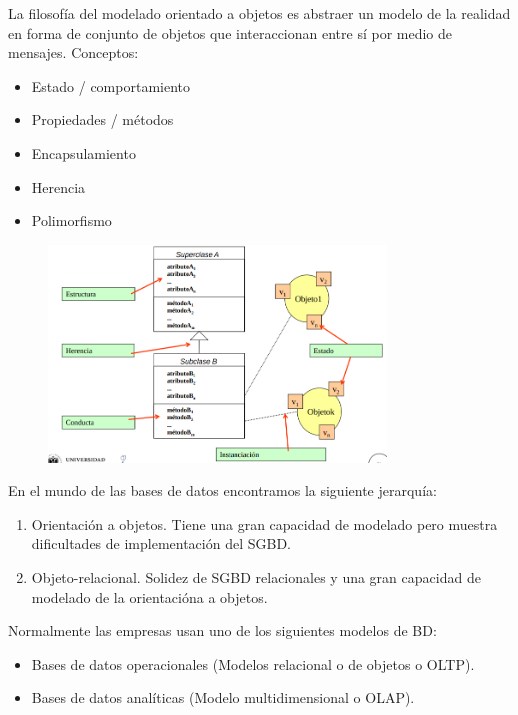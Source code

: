 \documentclass[a4paper,11pt]{article}
\begin{document}
La filosofía del modelado orientado a objetos es abstraer un modelo de la realidad en forma de conjunto de objetos que interaccionan entre sí por medio de mensajes. Conceptos:

\begin{itemize}
\item Estado / comportamiento
\item Propiedades / métodos
\item Encapsulamiento 
\item Herencia
\item Polimorfismo
\end{itemize}

\begin{figure}[h]
\centering
\includegraphics[scale=1,width=0.8\textwidth]{ejemplo_orientado_objetos.png}
\end{figure}

En el mundo de las bases de datos encontramos la siguiente jerarquía:

\begin{enumerate}
\item Orientación a objetos. Tiene una gran capacidad de modelado pero muestra dificultades de implementación del SGBD.

\item Objeto-relacional. Solidez de SGBD relacionales y una gran capacidad de modelado de la orientacióna a objetos.
\end{enumerate}

Normalmente las empresas usan uno de los siguientes modelos de BD:

\begin{itemize}
\item Bases de datos operacionales (Modelos relacional o de objetos o OLTP).
\item Bases de datos analíticas (Modelo multidimensional o OLAP).
\end{itemize}
\end{document}
